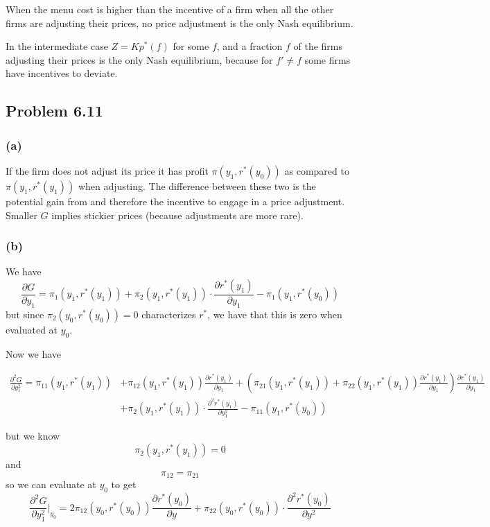 \documentclass[11pt]{amsart}
\begin{document}
	When the menu cost is higher than the incentive of a firm when all the other firms are adjusting their prices, no price adjustment is the only Nash equilibrium. 
	
	In the intermediate case $Z = K p^{*} (f)$ for some $f$, and a fraction $f$ of the firms adjusting their prices is the only Nash equilibrium, because for $f' \neq f$ some firms have incentives to deviate. 

\subsection{Problem 6.11}

\subsubsection*{(a)}
If the firm does not adjust its price it has profit $\pi \left( y_1, r^{*}(y_0)  \right)$ as compared to $\pi \left( y_1, r^{*}(y_1)  \right)$ when adjusting. 
The difference between these two is the potential gain from and therefore the incentive to engage in a price adjustment.
Smaller $G$ implies stickier prices (because adjustments are more rare). 

\subsubsection*{(b)}

We have
\[
\frac{\partial G}{\partial y_1} = \pi_1(y_1, r^*(y_1)) + \pi_2(y_1, r^*(y_1)) \cdot \frac{\partial r^*(y_1)}{\partial y_1} - \pi_1(y_1, r^*(y_0))
\]
but since $\pi_2(y_0, r^*(y_0)) = 0$ characterizes $r^*$, we have that this is zero when evaluated at $y_0$.

Now we have
\begin{tiny}
\begin{align*}
\frac{\partial^2 G}{\partial y_1^2} = \pi_{11}(y_1, r^*(y_1))  &+ \pi_{12}(y_1, r^*(y_1)) \frac{\partial r^*(y_1)}{\partial y_1} + \left(\pi_{21}(y_1, r^*(y_1)) + \pi_{22}(y_1, r^*(y_1)) \frac{\partial r^*(y_1)}{\partial y_1} \right) \frac{\partial r^*(y_1)}{\partial y_1} \\&+ \pi_2(y_1, r^*(y_1)) \cdot \frac{\partial^2 r^*(y_1)}{\partial y_1^2} - \pi_11(y_1, r^*(y_0))
\end{align*}
\end{tiny}
but we know
\[
\pi_2(y_1, r^*(y_1)) = 0
\]
and 
\[
\pi_{12} = \pi_{21}
\]
so we can evaluate at $y_0$ to get
\[
\frac{\partial^2 G}{\partial y_1^2} \vert_{y_0} = 2 \pi_{12}(y_0, r^*(y_0)) \frac{\partial r^*(y_0)}{\partial y} + \pi_{22}(y_0, r^*(y_0)) \cdot \frac{\partial^2 r^*(y_0)}{\partial y^2}
\]
\end{document}
